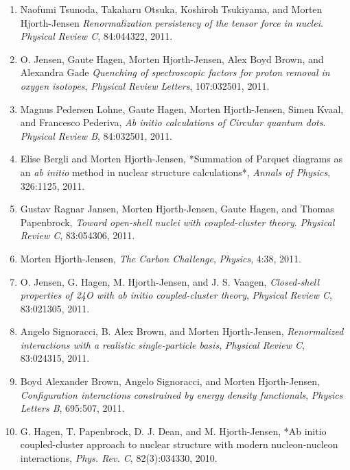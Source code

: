 \documentclass[%
oneside,                 %
final,                   %
10pt]{article}
\begin{document}
\begin{enumerate}
\item Naofumi Tsunoda, Takaharu Otsuka, Koshiroh Tsukiyama, and Morten Hjorth-Jensen  \emph{Renormalization persistency of the tensor force in nuclei}.  \emph{Physical Review C}, 84:044322, 2011.  

\item O. Jensen, Gaute Hagen, Morten Hjorth-Jensen, Alex Boyd Brown, and Alexandra Gade  \emph{Quenching of spectroscopic factors for proton removal in oxygen isotopes},   \emph{Physical Review Letters}, 107:032501, 2011. 

\item Magnus Pedersen Lohne, Gaute Hagen, Morten Hjorth-Jensen, Simen Kvaal, and Francesco Pederiva,  \emph{Ab initio calculations of Circular quantum dots}.  \emph{Physical Review B}, 84:032501, 2011.    

\item Elise Bergli and Morten Hjorth-Jensen,  *Summation of Parquet diagrams as an \emph{ab initio} method in nuclear structure calculations*,  \emph{Annals of Physics}, 326:1125, 2011.   

\item Gustav Ragnar Jansen, Morten Hjorth-Jensen, Gaute Hagen, and Thomas Papenbrock,  \emph{Toward open-shell nuclei with coupled-cluster theory}.  \emph{Physical Review C}, 83:054306, 2011. 

\item Morten Hjorth-Jensen,  \emph{The Carbon Challenge},  \emph{Physics}, 4:38, 2011.  

\item O. Jensen, G. Hagen, M. Hjorth-Jensen, and J. S. Vaagen,  \emph{Closed-shell properties of 24O with ab initio coupled-cluster theory},  \emph{Physical Review C}, 83:021305, 2011. 

\item Angelo Signoracci, B. Alex Brown, and Morten Hjorth-Jensen,  \emph{Renormalized interactions with a realistic single-particle   basis},  \emph{Physical Review C}, 83:024315, 2011.   

\item Boyd Alexander Brown, Angelo Signoracci, and Morten Hjorth-Jensen,  \emph{Configuration interactions constrained by energy density  functionals},  \emph{Physics Letters B}, 695:507, 2011.  

\item G. Hagen, T. Papenbrock, D. J. Dean, and M. Hjorth-Jensen,  *Ab initio coupled-cluster approach to nuclear structure with modern   nucleon-nucleon interactions,  \emph{Phys. Rev. C}, 82(3):034330, 2010.  


\end{enumerate}
\end{document}

